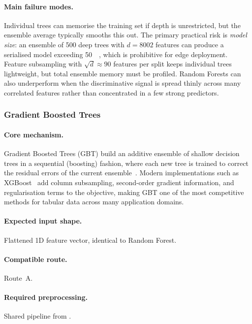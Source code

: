\paragraph{Main failure modes.}
Individual trees can memorise the training set if depth is
unrestricted, but the ensemble average typically smooths this out.
The primary practical risk is \emph{model size}: an ensemble of 500
deep trees with $d = 8002$ features can produce a serialised model
exceeding \SI{50}{\mega\byte}, which is prohibitive for edge
deployment.  Feature subsampling with $\sqrt{d} \approx 90$ features
per split keeps individual trees lightweight, but total ensemble
memory must be profiled.  Random Forests can also underperform when
the discriminative signal is spread thinly across many correlated
features rather than concentrated in a few strong predictors.


\subsubsection{Gradient Boosted Trees}\label{subsec:gbt}

\paragraph{Core mechanism.}
Gradient Boosted Trees (GBT) build an additive ensemble of shallow
decision trees in a sequential (boosting) fashion, where each new tree
is trained to correct the residual errors of the current
ensemble~\cite{friedman2001gbm}.  Modern implementations such as
XGBoost~\cite{chen2016xgboost} add column subsampling,
second-order gradient information, and regularisation terms to the
objective, making GBT one of the most competitive methods for
tabular data across many application domains.

\paragraph{Expected input shape.}
Flattened 1D feature vector, identical to Random Forest.

\paragraph{Compatible route.}
Route~A.

\paragraph{Required preprocessing.}
Shared pipeline from .

